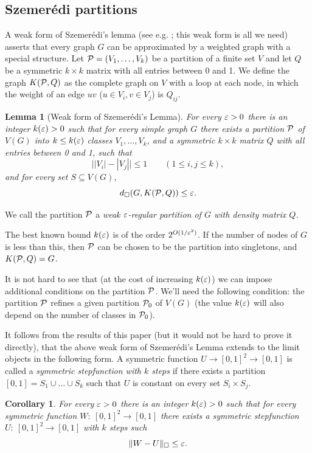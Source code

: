 \documentclass[fleqn]{article}
\newtheorem{lemma}[theorem]{Lemma}
\newtheorem{corollary}[theorem]{Corollary}
\begin{document}
\subsection{Szemer\'edi partitions}

A weak form of Szemer\'edi's lemma (see e.g. \cite{FK}; this weak
form is all we need) asserts that every graph $G$ can be approximated
by a weighted graph with a special structure. Let
${\cal P}=(V_1,\dots,V_k)$ be a partition of a finite set $V$ and let $Q$
be a symmetric $k\times k$ matrix with all entries between 0 and 1.
We define the graph $K({\cal P},Q)$ as the complete graph on $V$ with a
loop at each node, in which the weight of an edge $uv$ ($u\in V_i,
v\in V_j$) is $Q_{ij}$.

\begin{lemma}[Weak form of Szemer\'edi's Lemma]\label{WEAK-SZEM}
For every $\varepsilon>0$ there is an integer $k(\varepsilon)>0$ such that for
every simple graph $G$ there exists a partition ${\cal P}$ of $V(G)$ into
$k\le k(\varepsilon)$ classes $V_1,\dots,V_k$, and a symmetric $k\times k$
matrix $Q$ with all entries between 0 and 1, such that
\[
\bigl||V_i|-|V_j|\bigr|\le 1 \qquad (1\le i,j\le k),
\]
and for every set $S\subseteq V(G)$,
\[
d_\square(G, K({\cal P},Q)) \le \varepsilon.
\]
\end{lemma}

We call the partition ${\cal P}$ a {\it weak $\varepsilon$-regular partition of
$G$ with density matrix $Q$.}

The best known bound $k(\varepsilon)$ is of the order $2^{O(1/\varepsilon^2)}$. If
the number of nodes of $G$ is less than this, then ${\cal P}$ can be
chosen to be the partition into singletons, and $K({\cal P},Q)=G$.

It is not hard to see that (at the cost of increasing $k(\varepsilon)$) we
can impose additional conditions on the partition ${\cal P}$. We'll need
the following condition: the partition ${\cal P}$ refines a given
partition ${\cal P}_0$ of $V(G)$ (the value $k(\varepsilon)$ will also depend on
the number of classes in ${\cal P}_0$).

It follows from the results of this paper (but it would not be hard
to prove it directly), that the above weak form of Szemer\'edi's
Lemma extends to the limit objects in the following form. A symmetric
function $U\to [0,1]^2\to[0,1]$ is called a {\it symmetric
stepfunction with $k$ steps} if there exists a partition
$[0,1]=S_1\cup\dots\cup S_k$ such that $U$ is constant on every set
$S_i\times S_j$.

\begin{corollary}\label{WEAK-SZEM-W}
For every $\varepsilon>0$ there is an integer $k(\varepsilon)>0$ such that for
every symmetric function $W:~[0,1]^2\to[0,1]$ there exists a
symmetric stepfunction $U:~[0,1]^2\to[0,1]$ with $k$ steps such
\[
\|W-U\|_\square\le\varepsilon.
\]
\end{corollary}
\end{document}
